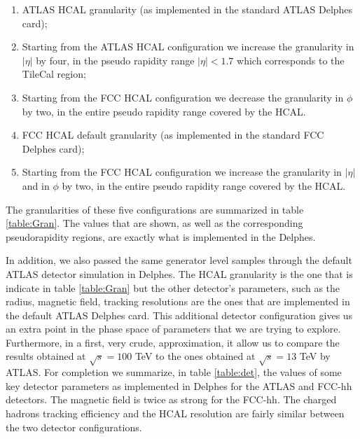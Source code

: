 \begin{enumerate}
	\item ATLAS HCAL granularity (as implemented in the standard ATLAS Delphes card);
	\item Starting from the ATLAS HCAL configuration we increase the granularity in $|\eta|$ by four, in the pseudo rapidity range $|\eta|<1.7$ which corresponds to the TileCal region;
	\item Starting from the FCC HCAL configuration we decrease the granularity in $\phi$ by two, in the entire pseudo rapidity range covered by the HCAL.
	\item FCC HCAL default granularity (as implemented in the standard FCC Delphes card);
	\item Starting from the FCC HCAL configuration we increase the granularity in $|\eta|$ and in $\phi$ by two, in the entire pseudo rapidity range covered by the HCAL.
\end{enumerate}

The granularities of these five configurations are summarized in table \ref{table:Gran}. The values that are shown, as well as the corresponding pseudorapidity regions, are exactly what is implemented in the Delphes. 

In addition, we also passed the same generator level samples through the default ATLAS detector simulation in Delphes. The HCAL granularity is the one that is indicate in table \ref{table:Gran} but the other detector's parameters, such as the radius, magnetic field, tracking resolutions are the ones that are implemented in the default ATLAS Delphes card. This additional detector configuration gives us an extra point in the phase space of parameters that we are trying to explore. Furthermore, in a first, very crude, approximation, it allow us to compare the results obtained at $\sqrt{s}=100$ TeV to the ones obtained at $\sqrt{s}=13$ TeV by ATLAS.
For completion we summarize, in table \ref{table:det}, the values of some key detector parameters as implemented in Delphes for the ATLAS and FCC-hh detectors. The magnetic field is twice as strong for the FCC-hh. The charged hadrons tracking efficiency and the HCAL resolution are fairly similar between the two detector configurations.

